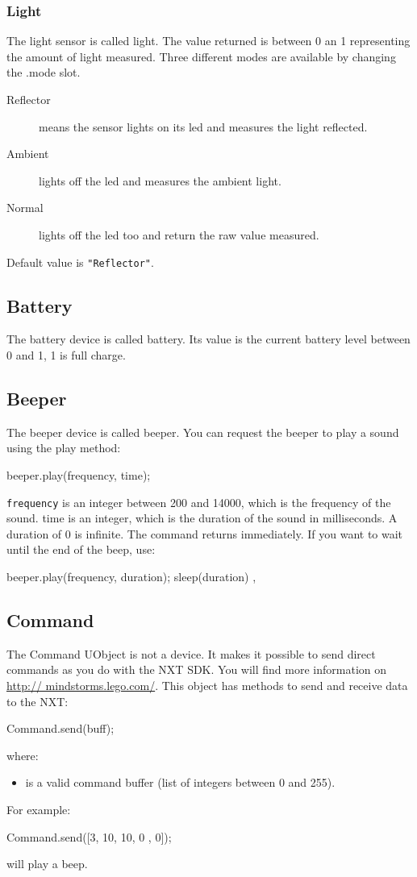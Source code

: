\subsubsection{Light}
The light sensor is called light.  The value returned is between 0 an 1
representing the amount of light measured.  Three different modes are
available by changing the .mode slot.
\begin{description}
\item[Reflector] means the sensor lights on its led and measures the light
  reflected.
\item[Ambient] lights off the led and measures the ambient light.
\item[Normal] lights off the led too and return the raw value measured.
\end{description}
Default value is \lstinline{"Reflector"}.

\subsection{Battery}
The battery device is called battery.  Its value is the current battery
level between 0 and 1, 1 is full charge.
\subsection{Beeper}
The beeper device is called beeper.  You can request the beeper to play a
sound using the play method:
\begin{urbiunchecked}
beeper.play(frequency, time);
\end{urbiunchecked}

\lstinline{frequency} is an integer between 200 and 14000, which is the
frequency of the sound. time is an integer, which is the duration of the
sound in milliseconds.  A duration of 0 is infinite.  The command returns
immediately. If you want to wait until the end of the beep, use:
\begin{urbiunchecked}
{
  beeper.play(frequency, duration);
  sleep(duration)
},
\end{urbiunchecked}

\subsection{Command}
The Command UObject is not a device. It makes it possible to send direct
commands as you do with the NXT SDK. You will find more information on
\url{http:// mindstorms.lego.com/}. This object has methods to send and
receive data to the NXT:
\begin{urbiunchecked}
Command.send(buff);
\end{urbiunchecked}
where:
\begin{itemize}
\item {} is a valid command buffer (list of integers between 0 and
  255).
\end{itemize}
For example:
\begin{urbiunchecked}
Command.send([3, 10, 10, 0 , 0]);
\end{urbiunchecked}
will play a beep.


